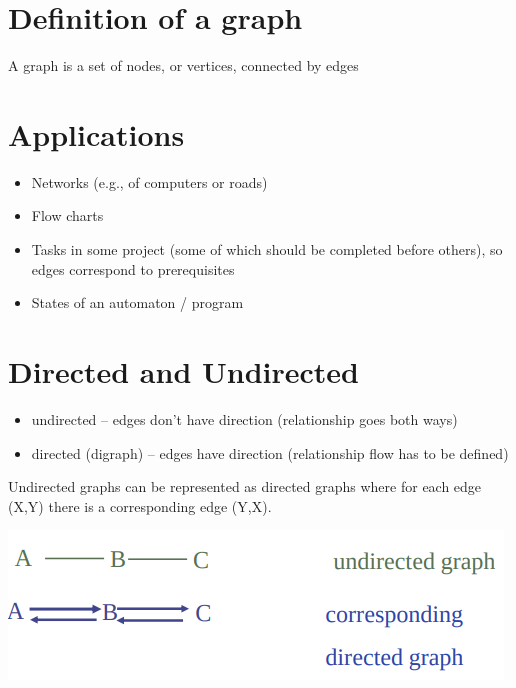 \documentclass{article}
\begin{document}
\section{Definition of a graph}
\begin{flushleft}
A graph is a set of nodes, or vertices, connected by edges
\end{flushleft}

\section{Applications}
\begin{itemize}
	\item Networks (e.g., of computers or roads)
	\item Flow charts
	\item Tasks in some project (some of which should be completed before others), so edges correspond to prerequisites 
	\item States of an automaton / program
\end{itemize}

\section{Directed and Undirected}
\begin{itemize}
	\item undirected – edges don’t have direction (relationship goes both ways)
	\item directed (digraph) – edges have direction (relationship flow has to be defined)
\end{itemize}
\begin{flushleft}
	Undirected graphs can be represented as directed graphs where for each edge (X,Y) there is a corresponding edge (Y,X).
\end{flushleft}
\begin{center}
	\includegraphics[scale=0.5]{graph_egzample_1.png}
\end{center}
\end{document}
